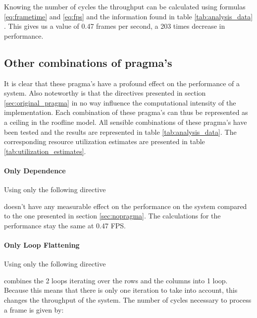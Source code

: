 Knowing the number of cycles the throughput can be calculated using formulas \ref{eq:frametime} and \ref{eq:fps} and the information found in table \ref{tab:analysis_data} . This gives us a value of 0.47 frames per second, a 203 times decrease in performance.

\subsection{Other combinations of pragma's}

It is clear that these pragma's have a profound effect on the performance of a system. Also noteworthy is that the directives presented in section \ref{sec:original_pragma} in no way influence the computational intensity of the implementation. Each combination of these pragma's can thus be represented as a ceiling in the roofline model.
All sensible combinations of these pragma's have been tested and the results are represented in table  \ref{tab:analysis_data}. The corresponding resource utilization estimates are presented in table \ref{tab:utilization_estimates}.

\paragraph{Only Dependence}
Using only the following directive


doesn't have any measurable effect on the performance on the system compared to the one presented in section \ref{sec:nopragma}. The calculations for the performance stay the same at 0.47 FPS.

\paragraph{Only Loop Flattening}
Using only the following directive


combines the 2 loops iterating over the rows and the columns into 1 loop. Because this means that there is only one iteration to take into account, this changes the throughput of the system. The number of cycles necessary to process a frame is given by:


